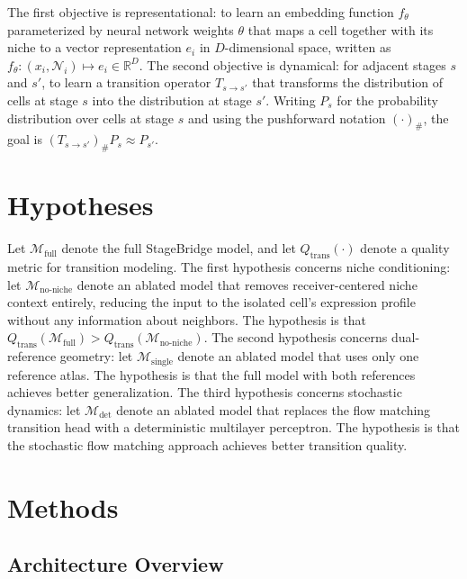 \documentclass[conference]{IEEEtran}
\begin{document}
The first objective is representational: to learn an embedding function $f_\theta$ parameterized by neural network weights $\theta$ that maps a cell together with its niche to a vector representation $e_i$ in $D$-dimensional space, written as $f_\theta: (x_i, \mathcal{N}_i) \mapsto e_i \in \mathbb{R}^D$. The second objective is dynamical: for adjacent stages $s$ and $s'$, to learn a transition operator $T_{s \to s'}$ that transforms the distribution of cells at stage $s$ into the distribution at stage $s'$. Writing $P_s$ for the probability distribution over cells at stage $s$ and using the pushforward notation $(\cdot)_\#$, the goal is $(T_{s \to s'})_\# P_s \approx P_{s'}$.

\section{Hypotheses}

Let $\mathcal{M}_{\text{full}}$ denote the full StageBridge model, and let $Q_{\text{trans}}(\cdot)$ denote a quality metric for transition modeling. The first hypothesis concerns niche conditioning: let $\mathcal{M}_{\text{no-niche}}$ denote an ablated model that removes receiver-centered niche context entirely, reducing the input to the isolated cell's expression profile without any information about neighbors. The hypothesis is that $Q_{\text{trans}}(\mathcal{M}_{\text{full}}) > Q_{\text{trans}}(\mathcal{M}_{\text{no-niche}})$. The second hypothesis concerns dual-reference geometry: let $\mathcal{M}_{\text{single}}$ denote an ablated model that uses only one reference atlas. The hypothesis is that the full model with both references achieves better generalization. The third hypothesis concerns stochastic dynamics: let $\mathcal{M}_{\text{det}}$ denote an ablated model that replaces the flow matching transition head with a deterministic multilayer perceptron. The hypothesis is that the stochastic flow matching approach achieves better transition quality.

\section{Methods}

\subsection{Architecture Overview}
\end{document}
